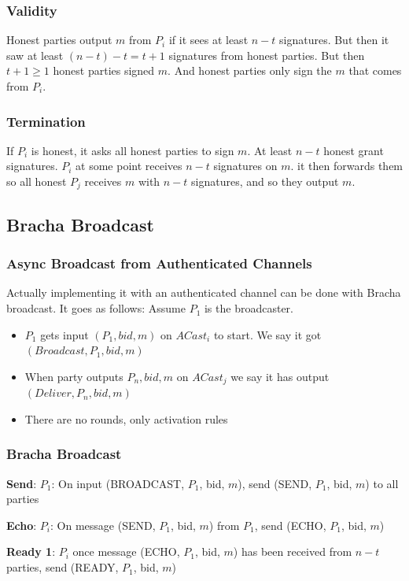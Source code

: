     \begin{frame}
        \frametitle{Validity}
            Honest parties output $m$ from $P_i$ if it sees at least $n -t$ signatures. But then it saw at least $(n-t) - t = t + 1$ signatures from honest parties. But then $t + 1 \geq 1$ honest parties signed $m$. And honest parties only sign the $m$ that comes from $P_i$.
    \end{frame}

    \begin{frame}
        \frametitle{Termination}
            If $P_i$ is honest, it asks all honest parties to sign $m$. At least $n-t$ honest grant signatures. $P_i$ at some point receives $n-t$ signatures on $m$. it then forwards them so all honest $P_j$ receives $m$ with $n-t$ signatures, and so they output $m$.
    \end{frame}

    \subsection{Bracha Broadcast}
        \begin{frame}
            \frametitle{Async Broadcast from Authenticated Channels}
                Actually implementing it with an authenticated channel can be done with Bracha broadcast. It goes as follows:
                Assume $P_1$ is the broadcaster. 
                \begin{itemize}
                    \item $P_1$ gets input $(P_1, bid, m)$ on $ACast_i$ to start. We say it got $(Broadcast, P_1, bid, m)$
                    \item When party outputs $P_n, bid, m$ on $ACast_j$ we say it has output $(Deliver, P_n, bid, m)$
                    \item There are no rounds, only activation rules
                \end{itemize}
        \end{frame}

    \begin{frame}
        \frametitle{Bracha Broadcast}
            \textbf{Send}: $P_1$: On input (BROADCAST, $P_1$, bid, $m$), send (SEND, $P_1$, bid, $m$) to all parties


            \textbf{Echo}: $P_i$: On message (SEND, $P_1$, bid, $m$) from $P_1$, send (ECHO, $P_1$, bid, $m$)


            \textbf{Ready 1}: $P_i$ once message (ECHO, $P_1$, bid, $m$) has been received from $n -t$ parties, send (READY, $P_1$, bid, $m$)
    \end{frame}

